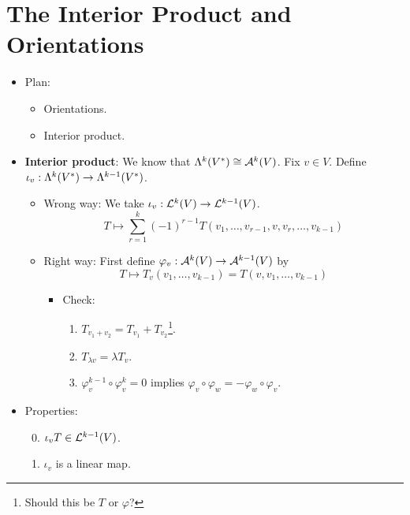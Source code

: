 \documentclass[../notes.tex]{subfiles}
\begin{document}
\section{The Interior Product and Orientations}
\begin{itemize}
    \item {}Plan:
    \begin{itemize}
        \item Orientations.
        \item Interior product.
    \end{itemize}
    \item \textbf{Interior product}: We know that $\lam[k]{V^*}\cong\alt[k]{V}$. Fix $v\in V$. Define $\iota_v:\lam[k]{V^*}\to\lam[k-1]{V^*}$.
    \begin{itemize}
        \item Wrong way: We take $\iota_v:\lin[k]{V}\to\lin[k-1]{V}$.
        \begin{equation*}
            T \mapsto \sum_{r=1}^k(-1)^{r-1}T(v_1,\dots,v_{r-1},v,v_r,\dots,v_{k-1})
        \end{equation*}
        \item Right way: First define $\varphi_v:\alt[k]{V}\to\alt[k-1]{V}$ by
        \begin{equation*}
            T \mapsto T_v(v_1,\dots,v_{k-1})=T(v,v_1,\dots,v_{k-1})
        \end{equation*}
        \begin{itemize}
            \item Check:
            \begin{enumerate}
                \item $T_{v_1+v_2}=T_{v_1}+T_{v_2}$\footnote{Should this be $T$ or $\varphi$?}.
                \item $T_{\lambda v}=\lambda T_v$.
                \item $\varphi_v^{k-1}\circ\varphi_v^k=0$ implies $\varphi_v\circ\varphi_w=-\varphi_w\circ\varphi_v$.
            \end{enumerate}
        \end{itemize}
    \end{itemize}
    \item Properties:
    \begin{enumerate}
        \setcounter{enumi}{-1}
        \item $\iota_vT\in\lin[k-1]{V}$.
        \item $\iota_v$ is a linear map.
        \begin{itemize}

\end{itemize}
\end{enumerate}
\end{itemize}
\end{document}
